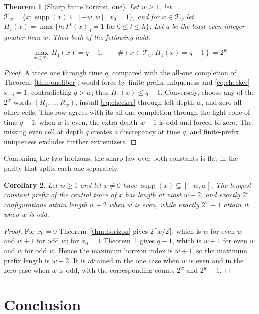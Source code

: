 \documentclass[11pt]{article}
\newtheorem{theorem}{Theorem}
\newtheorem{corollary}[theorem]{Corollary}
\newcommand{\supp}{\operatorname{supp}}
\begin{document}
\begin{theorem}[Sharp finite horizon, one]\label{thm:onehorizon}
Let $w\geq1$, let
$\mathcal T_w=\{x:\supp(x)\subseteq[-w,w],\ x_0=1\}$, and for
$x\in\mathcal T_w$ let
$H_1(x)=\max\{h:F^t(x)_0=1\text{ for }0\leq t\leq h\}$.  Let $q$ be the
least even integer greater than $w$.  Then both of the following hold.

\begin{equation}\label{eq:sharpone}
 \max_{x\in\mathcal T_w}H_1(x)=q-1,
 \qquad
 \#\!\left\{x\in\mathcal T_w:H_1(x)=q-1\right\}=2^w
\end{equation}
\end{theorem}
\begin{proof}
A trace one through time $q$, compared with the all-one completion of
Theorem~\ref{thm:onefiber}, would force by finite-prefix uniqueness and
\eqref{eq:checker} $x_{-q}=1$, contradicting $q>w$; thus $H_1(x)\leq q-1$.
Conversely, choose any of the $2^w$ words $(R_1,\ldots,R_w)$, install
\eqref{eq:checker} through left depth $w$, and zero all other cells.  This row
agrees with its all-one completion through the light cone of time $q-1$; when
$w$ is even, the extra depth $w+1$ is odd and forced to zero.  The missing even
cell at depth $q$ creates a discrepancy at time $q$, and finite-prefix
uniqueness excludes further extremizers.
\end{proof}

Combining the two horizons, the sharp law over both constants is flat in the
parity that splits each one separately.

\begin{corollary}\label{cor:bothhorizon}
Let $w\geq1$ and let $x\neq0$ have $\supp(x)\subseteq[-w,w]$.  The longest
constant prefix of the central trace of $x$ has length at most $w+2$, and
exactly $2^w$ configurations attain length $w+2$ when $w$ is even, while
exactly $2^w-1$ attain it when $w$ is odd.
\end{corollary}
\begin{proof}
For $x_0=0$ Theorem~\ref{thm:horizon} gives $2\lceil w/2\rceil$, which is $w$
for even $w$ and $w+1$ for odd $w$; for $x_0=1$
Theorem~\ref{thm:onehorizon} gives $q-1$, which is $w+1$ for even $w$ and $w$
for odd $w$.  Hence the maximum horizon index is $w+1$, so the maximum prefix
length is $w+2$.  It is attained in the one case when $w$ is even and in the
zero case when $w$ is odd, with the corresponding counts $2^w$ and $2^w-1$.
\end{proof}


\section{Conclusion}
\end{document}
